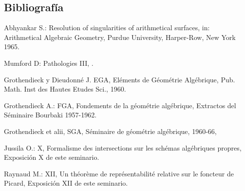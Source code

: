 \subsection*{Bibliografía}
\begin{enumerate}[label={[\arabic*]}]
\item Abhyankar S.: Resolution of singularities of arithmetical surfaces, in: Arithmetical Algebraic Geometry, Purdue University, Harper-Row, New York 1965.
\item Mumford D: Pathologies III, . %
\item Grothendieck  y Dieudonn\'e J. EGA, El\'ements de G\'eom\'etrie Alg\'ebrique, Pub. Math. Inst des Hautes Etudes Sci., 1960. %
\item Grothendieck A.: FGA, Fondements de la g\'eom\'etrie alg\'ebrique, Extractos del S\'eminaire Bourbaki 1957-1962.
\item Grothendieck  et alii, SGA, S\'eminaire de g\'eom\'etrie alg\'ebrique, 1960-66,  %
\item Jussila O.: X, Formalisme des intersections sur les sch\'emas alg\'ebriques propres, Exposición X de este seminario.
\item Raynaud M.: XII, Un th\'eor\`eme de repr\'esentabilit\'e relative sur le foncteur de Picard, Exposición XII de este seminario.
\end{enumerate}



\providecommand{\Kb}{K^\bullet}
\providecommand{\Db}{D}
\providecommand{\Gtop}{\operatorname{Gr}_{\mathrm{top}}}
\providecommand{\Ftop}{\operatorname{Fil}_{\mathrm{top}}}
